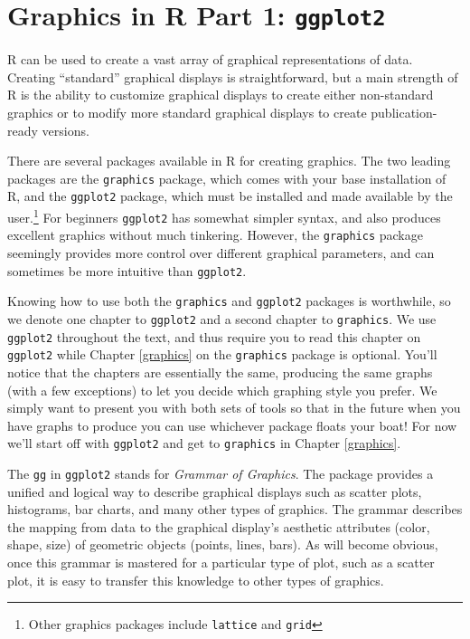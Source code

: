 \documentclass[
]{krantz}
\begin{document}
\hypertarget{graphics-in-r-part-1-ggplot2}{%
\chapter{\texorpdfstring{Graphics in R Part 1: \texttt{ggplot2}}{Graphics in R Part 1: ggplot2}}\label{graphics-in-r-part-1-ggplot2}}

R can be used to create a vast array of graphical representations of data. Creating ``standard'' graphical displays is straightforward, but a main strength of R is the ability to customize graphical displays to create either non-standard graphics or to modify more standard graphical displays to create publication-ready versions.

There are several packages available in R for creating graphics. The two leading packages are the \texttt{graphics} package, which comes with your base installation of R, and the \texttt{ggplot2} package, which must be installed and made available by the user.\footnote{Other graphics packages include \texttt{lattice} and \texttt{grid}} For beginners \texttt{ggplot2} has somewhat simpler syntax, and also produces excellent graphics without much tinkering. However, the \texttt{graphics} package seemingly provides more control over different graphical parameters, and can sometimes be more intuitive than \texttt{ggplot2}.

Knowing how to use both the \texttt{graphics} and \texttt{ggplot2} packages is worthwhile, so we denote one chapter to \texttt{ggplot2} and a second chapter to \texttt{graphics}. We use \texttt{ggplot2} throughout the text, and thus require you to read this chapter on \texttt{ggplot2} while Chapter \ref{graphics} on the \texttt{graphics} package is optional. You'll notice that the chapters are essentially the same, producing the same graphs (with a few exceptions) to let you decide which graphing style you prefer. We simply want to present you with both sets of tools so that in the future when you have graphs to produce you can use whichever package floats your boat! For now we'll start off with \texttt{ggplot2} and get to \texttt{graphics} in Chapter \ref{graphics}.

The \texttt{gg} in \texttt{ggplot2} stands for \emph{Grammar of Graphics}. The package provides a unified and logical way to describe graphical displays such as scatter plots, histograms, bar charts, and many other types of graphics. The grammar describes the mapping from data to the graphical display's aesthetic attributes (color, shape, size) of geometric objects (points, lines, bars). As will become obvious, once this grammar is mastered for a particular type of plot, such as a scatter plot, it is easy to transfer this knowledge to other types of graphics.
\end{document}
